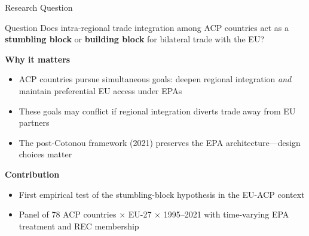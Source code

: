 \documentclass[aspectratio=169,11pt]{beamer}
\begin{document}
\begin{frame}{Research Question}

    \begin{block}{Question}
        Does intra-regional trade integration among ACP countries act as a
        \textbf{stumbling block} or \textbf{building block} for bilateral trade with the EU?
    \end{block}

    \bigskip

    \textbf{Why it matters}
    \begin{itemize}
        \item ACP countries pursue simultaneous goals: deepen regional integration \emph{and}
              maintain preferential EU access under EPAs
        \item These goals may conflict if regional integration diverts trade away from EU partners
        \item The post-Cotonou framework (2021) preserves the EPA architecture---design choices matter
    \end{itemize}

    \bigskip

    \textbf{Contribution}
    \begin{itemize}
        \item First empirical test of the stumbling-block hypothesis in the EU-ACP context
        \item Panel of 78 ACP countries $\times$ EU-27 $\times$ 1995--2021 with time-varying
              EPA treatment and REC membership
    \end{itemize}

\end{frame}
\end{document}
